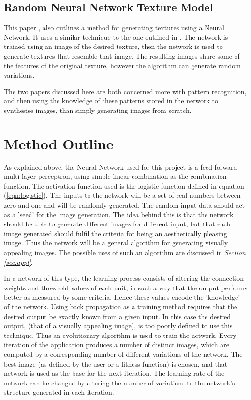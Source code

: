 \documentclass{acm_proc_article-sp}
\begin{document}
\subsection{Random Neural Network Texture Model}
This paper \cite{atalay:the}, also outlines a method for generating textures using a Neural Network. It uses a similar technique to the one outlined in \cite{Hwang_texturedimage}. The network is trained using an image of the desired texture, then the network is used to generate textures that resemble that image. The resulting images share some of the features of the original texture, however the algorithm can generate random variations. 

\vspace{3mm}
The two papers discussed here are both concerned more with pattern recognition, and then using the knowledge of these patterns stored in the network to synthesise images, than simply generating images from scratch. 

\section{Method Outline}
\label{sec:method}

As explained above, the Neural Network used for this project is a feed-forward multi-layer perceptron, using simple linear combination as the combination function. The activation function used is the logistic function defined in equation (\ref{eqn:logistic}). The inputs to the network will be a set of real numbers between zero and one and will be randomly generated. The random input data should act as a 'seed' for the image generation. The idea behind this is that the network should be able to generate different images for different input, but that each image generated should fulfil the criteria for being an aesthetically pleasing image. Thus the network will be a general algorithm for generating visually appealing images. The possible uses of such an algorithm are discussed in \textit{Section \ref{sec:appl}}. 

\vspace{3mm} 

In a network of this type, the learning process consists of altering the connection weights and threshold values of each unit, in such a way that the output performs better as measured by some criteria. Hence these values encode the 'knowledge' of the network. Using back propagation as a training method requires that the desired output be exactly known from a given input. In this case the desired output, (that of a visually appealing image), is too poorly defined to use this technique. Thus an evolutionary algorithm is used to train the network. Every iteration of the application produces a number of distinct images, which are computed by a corresponding number of different variations of the network. The best image (as defined by the user or a fitness function) is chosen, and that network is used as the base for the next iteration. The learning rate of the network can be changed by altering the number of variations to the network's structure generated in each iteration.
\end{document}
